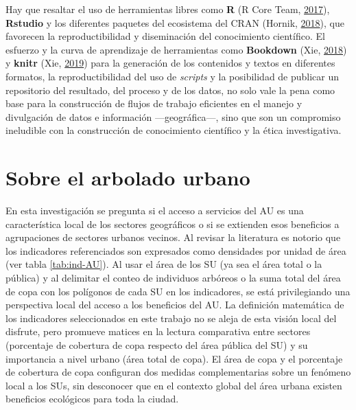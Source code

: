 \documentclass[12pt,a4paper,openany]{book}
\theoremstyle{definition}
\theoremstyle{definition}
\theoremstyle{definition}
\theoremstyle{remark}
\begin{document}
Hay que resaltar el uso de herramientas libres como \textbf{R} (R Core
Team, \protect\hyperlink{ref-R-base}{2017}), \textbf{Rstudio} y los
diferentes paquetes del ecosistema del CRAN (Hornik,
\protect\hyperlink{ref-R-cran}{2018}), que favorecen la
reproductibilidad y diseminación del conocimiento científico. El
esfuerzo y la curva de aprendizaje de herramientas como
\textbf{Bookdown} (Xie, \protect\hyperlink{ref-R-bookdown}{2018}) y
\textbf{knitr} (Xie, \protect\hyperlink{ref-R-knitr}{2019}) para la
generación de los contenidos y textos en diferentes formatos, la
reproductibilidad del uso de \emph{scripts} y la posibilidad de publicar
un repositorio del resultado, del proceso y de los datos, no solo vale
la pena como base para la construcción de flujos de trabajo eficientes
en el manejo y divulgación de datos e información ---geográfica---, sino
que son un compromiso ineludible con la construcción de conocimiento
científico y la ética investigativa.

\section{Sobre el arbolado urbano}\label{sobre-el-arbolado-urbano}

En esta investigación se pregunta si el acceso a servicios del AU es una
característica local de los sectores geográficos o si se extienden esos
beneficios a agrupaciones de sectores urbanos vecinos. Al revisar la
literatura es notorio que los indicadores referenciados son expresados
como densidades por unidad de área (ver tabla \ref{tab:ind-AU}). Al usar
el área de los SU (ya sea el área total o la pública) y al delimitar el
conteo de individuos arbóreos o la suma total del área de copa con los
polígonos de cada SU en los indicadores, se está privilegiando una
perspectiva local del acceso a los beneficios del AU. La definición
matemática de los indicadores seleccionados en este trabajo no se aleja
de esta visión local del disfrute, pero promueve matices en la lectura
comparativa entre sectores (porcentaje de cobertura de copa respecto del
área pública del SU) y su importancia a nivel urbano (área total de
copa). El área de copa y el porcentaje de cobertura de copa configuran
dos medidas complementarias sobre un fenómeno local a los SUs, sin
desconocer que en el contexto global del área urbana existen beneficios
ecológicos para toda la ciudad.
\end{document}
